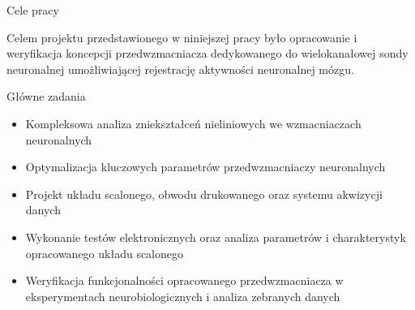 \begin{frame}{Cele pracy}

    \begin{alertblock}{}
        Celem projektu przedstawionego w niniejszej pracy było opracowanie i weryfikacja koncepcji przedwzmacniacza dedykowanego do wielokanałowej sondy neuronalnej umożliwiającej rejestrację aktywności neuronalnej mózgu.
    \end{alertblock}

    \begin{block}{Główne zadania}
        \begin{itemize}
            \item Kompleksowa analiza zniekształceń nieliniowych we wzmacniaczach neuronalnych
            \item Optymalizacja kluczowych parametrów przedwzmacniaczy neuronalnych
            \item  Projekt układu scalonego, obwodu drukowanego oraz systemu akwizycji danych
            \item Wykonanie testów elektronicznych oraz analiza parametrów i charakterystyk opracowanego układu scalonego
            \item Weryfikacja funkcjonalności opracowanego przedwzmacniacza  w eksperymentach neurobiologicznych i analiza zebranych danych
        \end{itemize}
    \end{block}

    
\end{frame}

